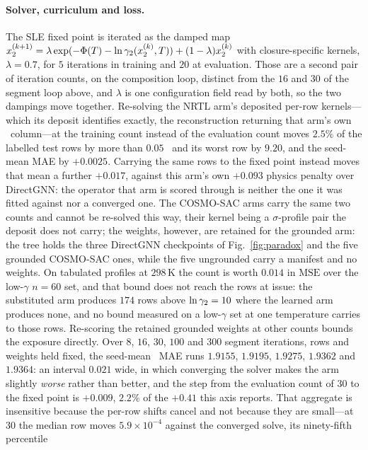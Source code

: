 \paragraph{Solver, curriculum and loss.} The SLE fixed point is iterated as the damped map
$x_2^{(k+1)}=\lambda\exp(-\Phi(T)-\ln\gamma_2(x_2^{(k)},T))+(1-\lambda)x_2^{(k)}$ with closure-specific
kernels, $\lambda=0.7$, for $5$ iterations in training and $20$ at evaluation. Those are a second
pair of iteration counts, on the composition loop, distinct from the $16$ and $30$ of the segment
loop above, and $\lambda$ is one configuration field read by both, so the two dampings move
together. Re-solving the NRTL arm's deposited per-row kernels---which its deposit identifies
exactly, the reconstruction returning that arm's own \lnx\ column---at the training count instead of
the evaluation count moves $2.5\%$ of the labelled test rows by more than $0.05$ \lnx\ and its worst
row by $9.20$, and the seed-mean MAE by $+0.0025$. Carrying the same rows to the fixed point instead
moves that mean a further $+0.017$, against this arm's own $+0.093$ physics penalty over DirectGNN:
the operator that arm is scored through is neither the one it was fitted
against nor a converged one. The COSMO-SAC arms carry the same two counts and cannot be re-solved
this way, their kernel being a $\sigma$-profile pair the deposit does not carry; the weights, however, are
retained for the grounded arm: the tree holds the three DirectGNN checkpoints of
Fig.~\ref{fig:paradox} and the five grounded COSMO-SAC ones, while the five ungrounded carry a
manifest and no weights. On tabulated profiles at $298$\,K the count is worth $0.014$ in
$\mathrm{MSE}$ over the low-$\gamma$ $n{=}60$ set, and that bound does not reach the rows at issue:
the substituted arm produces $174$ rows above $\ln\gamma_2=10$ where the learned arm produces none, and no
bound measured on a low-$\gamma$ set at one temperature carries to those rows. Re-scoring the
retained grounded weights at other counts bounds the exposure directly. Over $8$, $16$, $30$, $100$
and $300$ segment iterations, rows and weights held fixed, the seed-mean \lnx\ MAE runs $1.9155$,
$1.9195$, $1.9275$, $1.9362$ and $1.9364$: an interval $0.021$ wide, in which converging the solver
makes the arm slightly \emph{worse} rather than better, and the step from the evaluation count of
$30$ to the fixed point is $+0.009$, $2.2\%$ of the $+0.41$ this axis reports. That
aggregate is insensitive because the per-row shifts cancel and not because they are small---at $30$
the median row moves $5.9\times10^{-4}$ against the converged solve, its ninety-fifth percentile
